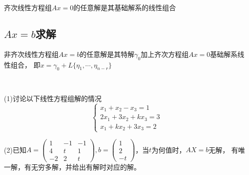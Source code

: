 \begin{theorem}[齐次线性方程组的解]
  齐次线性方程组$Ax = 0$的任意解是其基础解系的线性组合
\end{theorem}

\subsection{$Ax = b$求解}

\begin{theorem}[非齐次线性方程组的解]
  非齐次线性方程组$Ax = b$的任意解是其特解$\gamma_0$加上齐次方程组$Ax = 0$基础解系线性组合，
  即$x = \gamma_0 + L\{\eta_1,\cdots,\eta_{n-r}\}$
\end{theorem}

~

\begin{exercise}[求解非齐次线性方程组]
  (1)讨论以下线性方程组解的情况
  \begin{equation*}
    \begin{cases}
      x_1 + x_2 - x_3 = 1\\
      2x_1 + 3x_2 +kx_3 = 3\\
      x_1 + kx_2 + 3x_3 = 2
    \end{cases}
  \end{equation*}

  (2)已知$A = \left(
    \begin{array}{ccc}
      1&-1&-1\\
      4&t&1\\
      -2&2&t
    \end{array}
  \right), b = \left(
    \begin{array}{c}
      1\\
      2\\
      -t
    \end{array}
  \right)$，当$t$为何值时，$AX = b$无解，
  有唯一解，有无穷多解，并给出有解时对应的解。
\end{exercise}

